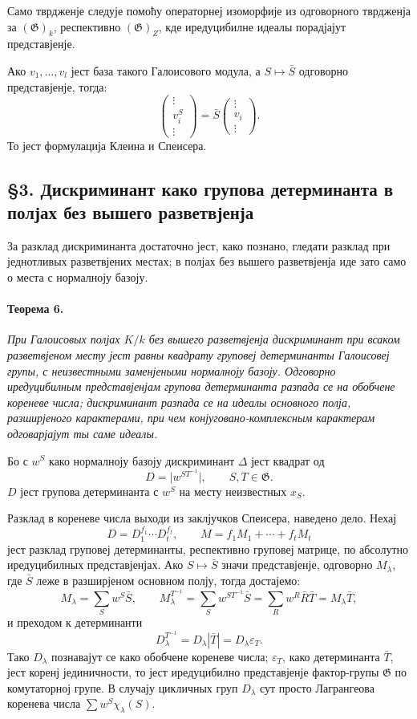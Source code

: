 \documentclass[11pt]{article}
\providecommand{\Gg}{\mathfrak{G}}
\begin{document}
Само тврдженје следује помоћу операторнеј изоморфије из одговорного тврдженја за \((\Gg)_k\), респективно \((\Gg)_Z\), кде иредуцибилне идеалы порадјајут представјенје.

Ако \(v_1,\ldots,v_l\) јест база такого Галоисового модула, а \(S\mapsto \bar S\) одговорно представјенје, тогда:
\[
        \begin{pmatrix}\vdots\\ v_i^S\\ \vdots\end{pmatrix}
        =\bar S\begin{pmatrix}\vdots\\ v_i\\ \vdots\end{pmatrix}.
\]
То јест формулација Клеина и Спеисера.

\subsection*{§3. Дискриминант како групова детерминанта в полјах без вышего разветвјенја}

За разклад дискриминанта достаточно јест, како познано, гледати разклад при једнотливых разветвјених местах; в полјах без вышего разветвјенја иде зато само о места с нормалноју базоју.

\paragraph{Теорема 6.}
\emph{При Галоисовых полјах \(K/k\) без вышего разветвјенја дискриминант при всаком разветвјеном месту јест равны квадрату груповеј детерминанты Галоисовеј групы, с неизвестными заменјеными нормалноју базоју. Одговорно иредуцибилным представјенјам групова детерминанта разпада се на обобчене кореневе числа; дискриминант разпада се на идеалы основного полја, разширјеного карактерами, при чем конјуговано-комплексным карактерам одговарјајут ты саме идеалы.}

Бо с \(w^S\) како нормалноју базоју дискриминант \(\Delta\) јест квадрат од
\[
        D=\bigl|w^{ST^{-1}}\bigr|,\qquad S,T\in\Gg.
\]
\(D\) јест групова детерминанта с \(w^S\) на месту неизвестных \(x_S\).

Разклад в кореневе числа выходи из заклјучков Спеисера, наведено дело. Нехај
\[
        D=D_1^{f_1}\cdots D_t^{f_t},
        \qquad
        M=f_1M_1+\cdots+f_tM_t
\]
јест разклад груповеј детерминанты, респективно груповеј матрице, по абсолутно иредуцибилных представјенјах. Ако \(S\mapsto\bar S\) значи представјенје, одговорно \(M_\lambda\), где \(\bar S\) леже в разширјеном основном полју, тогда достајемо:
\[
        M_\lambda=\sum_S w^S\bar S,
        \qquad
        M_\lambda^{T^{-1}}=\sum_S w^{ST^{-1}}\bar S
          =\sum_R w^R\bar R\bar T=M_\lambda\bar T,
\]
и преходом к детерминанти
\[
        D_\lambda^{T^{-1}}=D_\lambda|\bar T|=D_\lambda\varepsilon_T.
\]
Тако \(D_\lambda\) познавајут се како обобчене кореневе числа; \(\varepsilon_T\), како детерминанта \(\bar T\), јест коренј јединичности, то јест иредуцибилно представјенје фактор-групы \(\Gg\) по комутаторној групе. В случају цикличных груп \(D_\lambda\) сут просто Лагрангеова коренева числа \(\sum w^S\chi_\lambda(S)\).
\end{document}
